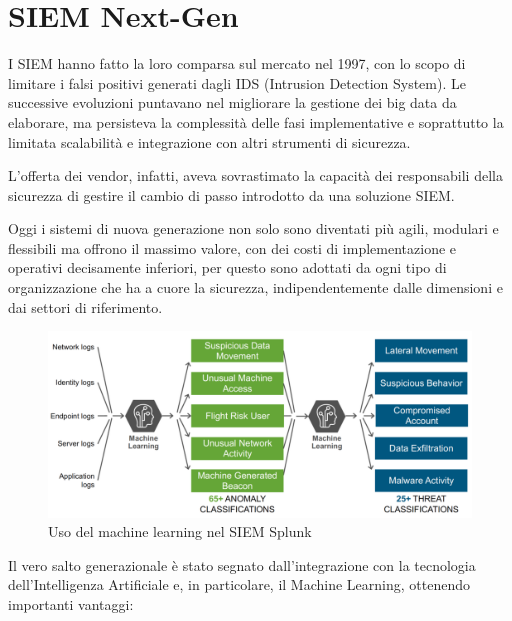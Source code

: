 \section{SIEM Next-Gen}
\label{sec:SIEM Next-Gen}

I SIEM hanno fatto la loro comparsa sul mercato nel 1997, con lo scopo di limitare i falsi positivi generati dagli IDS (Intrusion Detection System). Le successive evoluzioni puntavano nel migliorare la gestione dei big data da elaborare, ma persisteva la complessità delle fasi implementative e soprattutto la limitata scalabilità e integrazione con altri strumenti di sicurezza.\par
L’offerta dei vendor, infatti, aveva sovrastimato la capacità dei responsabili della sicurezza di gestire il cambio di passo introdotto da una soluzione SIEM.\par
Oggi i sistemi di nuova generazione non solo sono diventati più agili, modulari e flessibili ma offrono il massimo valore, con dei costi di implementazione e operativi decisamente inferiori, per questo sono adottati da ogni tipo di organizzazione che ha a cuore la sicurezza, indipendentemente dalle dimensioni e dai settori di riferimento.\par

\begin{figure}[h]
    \begin{center}
        \includegraphics[width=0.95\columnwidth]{images/1_modelloSIEM_img/splunk_UBA.png}
    \end{center}
    \caption{Uso del machine learning nel SIEM Splunk}
    \label{fig:Uso del machine learning nel SIEM Splunk}
\end{figure} 


Il vero salto generazionale è stato segnato dall’integrazione con la tecnologia dell’Intelligenza Artificiale e, in particolare, il Machine Learning, ottenendo importanti vantaggi: 



